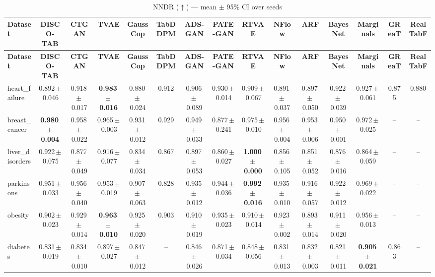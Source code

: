 \documentclass[8pt]{extarticle}
\begin{document}
\begin{longtable}{l*{14}{c}}
\caption{NNDR ($\uparrow$) --- mean $\pm$ 95\% CI over seeds}\\
\toprule
\textbf{Dataset} & \textbf{DISCO-TAB} & \textbf{CTGAN} & \textbf{TVAE} & \textbf{GaussCop} & \textbf{TabDDPM} & \textbf{ADS-GAN} & \textbf{PATE-GAN} & \textbf{RTVAE} & \textbf{NFlow} & \textbf{ARF} & \textbf{BayesNet} & \textbf{Marginals} & \textbf{GReaT} & \textbf{RealTabF} \\
\midrule
\endfirsthead
\toprule
\textbf{Dataset} & \textbf{DISCO-TAB} & \textbf{CTGAN} & \textbf{TVAE} & \textbf{GaussCop} & \textbf{TabDDPM} & \textbf{ADS-GAN} & \textbf{PATE-GAN} & \textbf{RTVAE} & \textbf{NFlow} & \textbf{ARF} & \textbf{BayesNet} & \textbf{Marginals} & \textbf{GReaT} & \textbf{RealTabF} \\
\midrule
\endhead
\bottomrule
\endfoot
heart\_failure & 0.892\,$\pm$\,0.046 & 0.918\,$\pm$\,0.017 & \textbf{0.983\,$\pm$\,0.016} & 0.880\,$\pm$\,0.024 & 0.912 & 0.906\,$\pm$\,0.089 & 0.930\,$\pm$\,0.014 & 0.909\,$\pm$\,0.067 & 0.891\,$\pm$\,0.037 & 0.897\,$\pm$\,0.050 & 0.922\,$\pm$\,0.039 & 0.927\,$\pm$\,0.061 & 0.875 & 0.880 \\
breast\_cancer & \textbf{0.980\,$\pm$\,0.004} & 0.958\,$\pm$\,0.022 & 0.965\,$\pm$\,0.003 & 0.931\,$\pm$\,0.012 & 0.929 & 0.949\,$\pm$\,0.033 & 0.877\,$\pm$\,0.241 & 0.975\,$\pm$\,0.010 & 0.956\,$\pm$\,0.004 & 0.953\,$\pm$\,0.006 & 0.950\,$\pm$\,0.001 & 0.972\,$\pm$\,0.025 & -- & -- \\
liver\_disorders & 0.922\,$\pm$\,0.075 & 0.877\,$\pm$\,0.049 & 0.916\,$\pm$\,0.077 & 0.834\,$\pm$\,0.034 & 0.867 & 0.897\,$\pm$\,0.053 & 0.860\,$\pm$\,0.027 & \textbf{1.000\,$\pm$\,0.000} & 0.856\,$\pm$\,0.105 & 0.851\,$\pm$\,0.052 & 0.876\,$\pm$\,0.016 & 0.864\,$\pm$\,0.059 & -- & -- \\
parkinsons & 0.951\,$\pm$\,0.033 & 0.956\,$\pm$\,0.040 & 0.953\,$\pm$\,0.019 & 0.907\,$\pm$\,0.063 & 0.828 & 0.935\,$\pm$\,0.012 & 0.944\,$\pm$\,0.036 & \textbf{0.992\,$\pm$\,0.016} & 0.935\,$\pm$\,0.010 & 0.916\,$\pm$\,0.057 & 0.922\,$\pm$\,0.012 & 0.969\,$\pm$\,0.022 & -- & -- \\
obesity & 0.902\,$\pm$\,0.023 & 0.929\,$\pm$\,0.014 & \textbf{0.963\,$\pm$\,0.010} & 0.925\,$\pm$\,0.020 & 0.903 & 0.910\,$\pm$\,0.019 & 0.935\,$\pm$\,0.023 & 0.910\,$\pm$\,0.014 & 0.923\,$\pm$\,0.002 & 0.893\,$\pm$\,0.014 & 0.911\,$\pm$\,0.020 & 0.956\,$\pm$\,0.013 & -- & -- \\
diabetes & 0.831\,$\pm$\,0.019 & 0.834\,$\pm$\,0.010 & 0.897\,$\pm$\,0.027 & 0.847\,$\pm$\,0.012 & -- & 0.846\,$\pm$\,0.026 & 0.871\,$\pm$\,0.034 & 0.848\,$\pm$\,0.056 & 0.831\,$\pm$\,0.013 & 0.832\,$\pm$\,0.003 & 0.821\,$\pm$\,0.011 & \textbf{0.905\,$\pm$\,0.021} & 0.863 & -- \\

\end{longtable}
\end{document}
